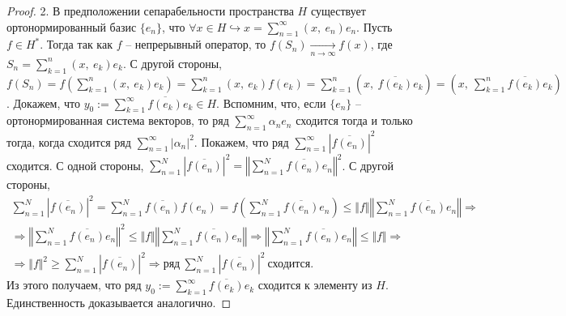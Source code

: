 \begin{proof}
2. В предположении сепарабельности пространства $\displaystyle H$ существует ортонормированный базис $\displaystyle \{e_{n}\}$, что $\displaystyle \forall x\in H\hookrightarrow x=\sum _{n=1}^{\infty }( x,\ e_{n}) e_{n}$. Пусть $\displaystyle f\in H^{*}$. Тогда так как $\displaystyle f$ -- непрерывный оператор, то $\displaystyle f( S_{n})\xrightarrow[n\rightarrow \infty ]{} f( x)$, где $\displaystyle S_{n} =\sum _{k=1}^{n}( x,\ e_{k}) e_{k}$. С другой стороны, $\displaystyle f( S_{n}) =f\left(\sum _{k=1}^{n}( x,\ e_{k}) e_{k}\right) =\sum _{k=1}^{n}( x,\ e_{k}) f( e_{k}) =\sum _{k=1}^{n}\left( x,\ \overline{f( e_{k})} e_{k}\right) =\left( x,\ \sum _{k=1}^{n}\overline{f( e_{k})} e_{k}\right)$. Докажем, что $\displaystyle y_{0} :=\sum _{k=1}^{\infty }\overline{f( e_{k})} e_{k} \in H$. Вспомним, что, если $\displaystyle \{e_{n}\}$ -- ортонормированная система векторов, то ряд $\displaystyle \sum _{n=1}^{\infty } \alpha _{n} e_{n}$ сходится тогда и только тогда, когда сходится ряд $\displaystyle \sum _{n=1}^{\infty }| \alpha _{n}| ^{2}$. Покажем, что ряд $\displaystyle \sum _{n=1}^{\infty }\left| \overline{f( e_{n})}\right| ^{2}$ сходится. С одной стороны, $\displaystyle \sum _{n=1}^{N}\left| \overline{f( e_{n})}\right| ^{2} =\left\Vert \sum _{n=1}^{N}\overline{f( e_{n})} e_{n}\right\Vert ^{2}$. С другой стороны, 
\begin{gather*}
\sum _{n=1}^{N}\left| \overline{f( e_{n})}\right| ^{2} =\sum _{n=1}^{N}\overline{f( e_{n})} f( e_{n}) =f\left(\sum _{n=1}^{N}\overline{f( e_{n})} e_{n}\right) \leqslant \Vert f\Vert \left\Vert \sum _{n=1}^{N}\overline{f( e_{n})} e_{n}\right\Vert \Rightarrow \\
\Rightarrow \left\Vert \sum _{n=1}^{N}\overline{f( e_{n})} e_{n}\right\Vert ^{2} \leqslant \Vert f\Vert \left\Vert \sum _{n=1}^{N}\overline{f( e_{n})} e_{n}\right\Vert \Rightarrow \left\Vert \sum _{n=1}^{N}\overline{f( e_{n})} e_{n}\right\Vert \leqslant \Vert f\Vert \Rightarrow \\
\Rightarrow \Vert f\Vert ^{2} \geqslant \sum _{n=1}^{N}\left| \overline{f( e_{n})}\right| ^{2} \Rightarrow \text{ряд} \ \sum _{n=1}^{N}\left| \overline{f( e_{n})}\right| ^{2} \ \text{сходится} .
\end{gather*}
 Из этого получаем, что ряд $\displaystyle y_{0} :=\sum _{k=1}^{\infty }\overline{f( e_{k})} e_{k}$ сходится к элементу из $\displaystyle H$. Единственность доказывается аналогично.
\end{proof}